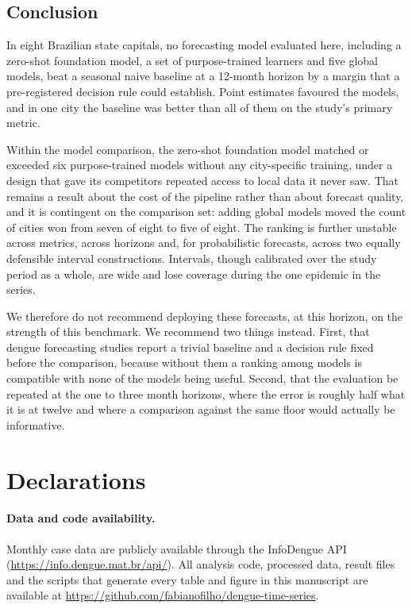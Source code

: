 \documentclass[11pt]{article}
\begin{document}
\subsection{Conclusion}

In eight Brazilian state capitals, no forecasting model evaluated here, including a
zero-shot foundation model, a set of purpose-trained learners and five global models, beat
a seasonal naive baseline at a 12-month horizon by a margin that a pre-registered decision
rule could establish. Point estimates favoured the models, and in one city the baseline was
better than all of them on the study's primary metric.

Within the model comparison, the zero-shot foundation model matched or exceeded six
purpose-trained models without any city-specific training, under a design that gave its
competitors repeated access to local data it never saw. That remains a result about the
cost of the pipeline rather than about forecast quality, and it is contingent on the
comparison set: adding global models moved the count of cities won from seven of eight to
five of eight. The ranking is further unstable across metrics, across horizons and, for
probabilistic forecasts, across two equally defensible interval constructions. Intervals,
though calibrated over the study period as a whole, are wide and lose coverage during the
one epidemic in the series.

We therefore do not recommend deploying these forecasts, at this horizon, on the strength
of this benchmark. We recommend two things instead. First, that dengue forecasting studies
report a trivial baseline and a decision rule fixed before the comparison, because without
them a ranking among models is compatible with none of the models being useful. Second,
that the evaluation be repeated at the one to three month horizons, where the error is
roughly half what it is at twelve and where a comparison against the same floor would
actually be informative.

\section*{Declarations}

\paragraph{Data and code availability.} Monthly case data are publicly available through
the InfoDengue API (\url{https://info.dengue.mat.br/api/}). All analysis code, processed
data, result files and the scripts that generate every table and figure in this
manuscript are available at \url{https://github.com/fabianofilho/dengue-time-series}.
\end{document}
